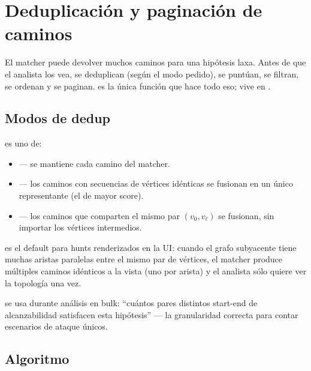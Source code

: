 \chapter{Deduplicación y paginación de caminos}
\label{ch:dedup-pagination}

El matcher puede devolver muchos caminos para una hipótesis laxa.
Antes de que el analista los vea, se deduplican (según el modo
pedido), se puntúan, se filtran, se ordenan y se paginan.
 es la única función que hace
todo eso; vive en .

\section{Modos de dedup}

\begin{definition}
 es uno de:
\begin{itemize}
    \item {} --- se mantiene cada camino del matcher.
    \item {} --- los caminos con secuencias de
        vértices idénticas se fusionan en un único
        representante (el de mayor score).
    \item {} --- los caminos que comparten el
        mismo par $(v_0, v_\ell)$ se fusionan, sin importar los
        vértices intermedios.
\end{itemize}
\end{definition}

 es el default para hunts renderizados en la UI:
cuando el grafo subyacente tiene muchas aristas paralelas entre
el mismo par de vértices, el matcher produce múltiples caminos
idénticos a la vista (uno por arista) y el analista sólo quiere
ver la topología una vez.

 se usa durante análisis en bulk: ``cuántos
pares distintos start-end de alcanzabilidad satisfacen esta
hipótesis'' --- la granularidad correcta para contar escenarios
de ataque únicos.

\section{Algoritmo}

